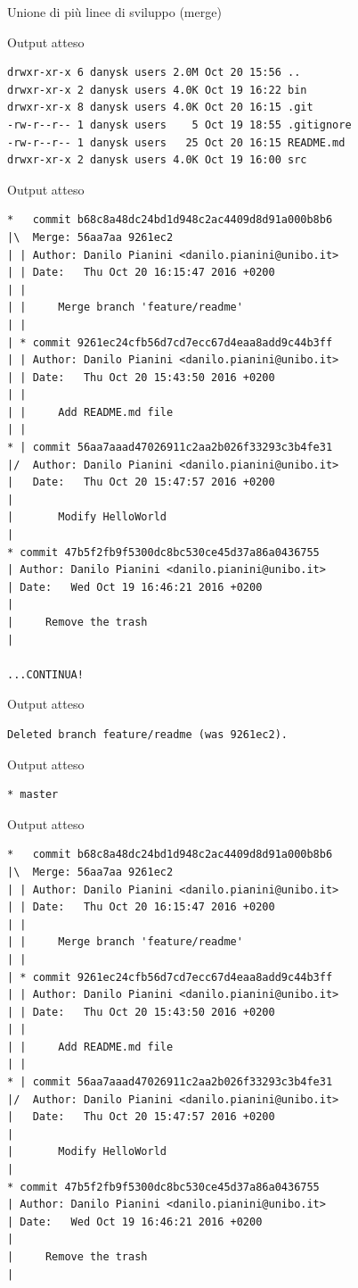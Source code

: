 \documentclass[xcolor=dvipsnames,presentation]{beamer}
\begin{document}
\begin{frame}{Unione di più linee di sviluppo (merge)}
\begin{block}{Output atteso}
\begin{Verbatim}[fontsize=\scriptsize]
drwxr-xr-x 6 danysk users 2.0M Oct 20 15:56 ..
drwxr-xr-x 2 danysk users 4.0K Oct 19 16:22 bin
drwxr-xr-x 8 danysk users 4.0K Oct 20 16:15 .git
-rw-r--r-- 1 danysk users    5 Oct 19 18:55 .gitignore
-rw-r--r-- 1 danysk users   25 Oct 20 16:15 README.md
drwxr-xr-x 2 danysk users 4.0K Oct 19 16:00 src
        \end{Verbatim}
    \end{block}
    \begin{block}{Output atteso}
        \begin{Verbatim}[fontsize=\tiny]
*   commit b68c8a48dc24bd1d948c2ac4409d8d91a000b8b6
|\  Merge: 56aa7aa 9261ec2
| | Author: Danilo Pianini <danilo.pianini@unibo.it>
| | Date:   Thu Oct 20 16:15:47 2016 +0200
| |
| |     Merge branch 'feature/readme'
| |
| * commit 9261ec24cfb56d7cd7ecc67d4eaa8add9c44b3ff
| | Author: Danilo Pianini <danilo.pianini@unibo.it>
| | Date:   Thu Oct 20 15:43:50 2016 +0200
| |
| |     Add README.md file
| |
* | commit 56aa7aaad47026911c2aa2b026f33293c3b4fe31
|/  Author: Danilo Pianini <danilo.pianini@unibo.it>
|   Date:   Thu Oct 20 15:47:57 2016 +0200
|
|       Modify HelloWorld
|
* commit 47b5f2fb9f5300dc8bc530ce45d37a86a0436755
| Author: Danilo Pianini <danilo.pianini@unibo.it>
| Date:   Wed Oct 19 16:46:21 2016 +0200
|
|     Remove the trash
|

...CONTINUA!
        \end{Verbatim}
    \end{block}
    \begin{block}{Output atteso}
        \begin{Verbatim}[fontsize=\scriptsize]
Deleted branch feature/readme (was 9261ec2).
        \end{Verbatim}
    \end{block}
    \begin{block}{Output atteso}
        \begin{Verbatim}[fontsize=\scriptsize]
* master
        \end{Verbatim}
    \end{block}
    \begin{block}{Output atteso}
        \begin{Verbatim}[fontsize=\tiny]
*   commit b68c8a48dc24bd1d948c2ac4409d8d91a000b8b6
|\  Merge: 56aa7aa 9261ec2
| | Author: Danilo Pianini <danilo.pianini@unibo.it>
| | Date:   Thu Oct 20 16:15:47 2016 +0200
| |
| |     Merge branch 'feature/readme'
| |
| * commit 9261ec24cfb56d7cd7ecc67d4eaa8add9c44b3ff
| | Author: Danilo Pianini <danilo.pianini@unibo.it>
| | Date:   Thu Oct 20 15:43:50 2016 +0200
| |
| |     Add README.md file
| |
* | commit 56aa7aaad47026911c2aa2b026f33293c3b4fe31
|/  Author: Danilo Pianini <danilo.pianini@unibo.it>
|   Date:   Thu Oct 20 15:47:57 2016 +0200
|
|       Modify HelloWorld
|
* commit 47b5f2fb9f5300dc8bc530ce45d37a86a0436755
| Author: Danilo Pianini <danilo.pianini@unibo.it>
| Date:   Wed Oct 19 16:46:21 2016 +0200
|
|     Remove the trash
|


\end{Verbatim}
\end{block}
\end{frame}
\end{document}
